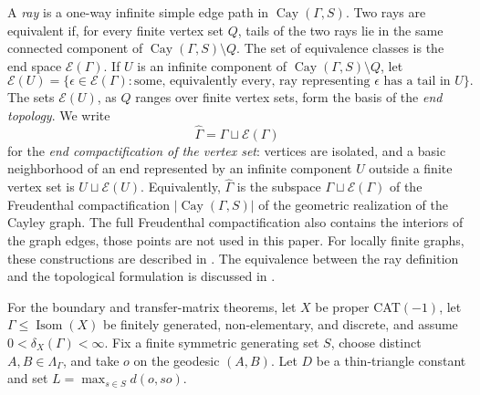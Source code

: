 \documentclass[11pt]{article}
\theoremstyle{definition}
\newcommand{\Isom}{\operatorname{Isom}}
\newcommand{\Cay}{\operatorname{Cay}}
\begin{document}
A \emph{ray} is a one-way infinite simple edge path in $\Cay(\Gamma,S)$.  Two rays are
equivalent if, for every finite vertex set $Q$, tails of the two rays lie in the same connected
component of $\Cay(\Gamma,S)\setminus Q$.  The set of equivalence classes is the end space
$\mathcal E(\Gamma)$.  If $U$ is an infinite component of
$\Cay(\Gamma,S)\setminus Q$, let
\[
 \mathcal E(U)=\{\epsilon\in\mathcal E(\Gamma):
 \text{some, equivalently every, ray representing $\epsilon$ has a tail in $U$}\}.
\]
The sets $\mathcal E(U)$, as $Q$ ranges over finite vertex sets, form the basis of the
\emph{end topology}.  We write
\[
 \widehat\Gamma=\Gamma\sqcup\mathcal E(\Gamma)
\]
for the \emph{end compactification of the vertex set}: vertices are isolated, and a basic
neighborhood of an end represented by an infinite component $U$ outside a finite vertex set
is $U\sqcup\mathcal E(U)$.  Equivalently, $\widehat\Gamma$ is the subspace
$\Gamma\sqcup\mathcal E(\Gamma)$ of the Freudenthal compactification
$|\Cay(\Gamma,S)|$ of the geometric realization of the Cayley graph.  The full Freudenthal
compactification also contains the interiors of the graph edges, those points are not used in
this paper.  For locally finite graphs, these constructions are described in
\cite[Section~8.5, especially the definition of $|G|$ and Theorem~8.5.2]{Diestel2010}.
The equivalence between the ray definition and the topological formulation is discussed in
\cite[Section~2]{DiestelKuhn2003}.

For the boundary and transfer-matrix theorems, let $X$ be proper CAT$(-1)$, let
$\Gamma\le\Isom(X)$ be finitely generated, non-elementary, and discrete, and assume
$0<\delta_X(\Gamma)<\infty$.  Fix a finite symmetric generating set $S$, choose distinct
$A,B\in\Lambda_\Gamma$, and take $o$ on the geodesic $(A,B)$.  Let $D$ be a
thin-triangle constant and set $L=\max_{s\in S}d(o,so)$.
\end{document}
